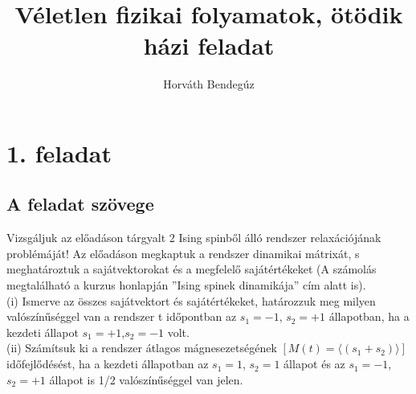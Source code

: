 \documentclass[12pt]{article}
\title{Véletlen fizikai folyamatok, ötödik házi feladat}
\author{Horváth Bendegúz}
\begin{document}
\maketitle
\section*{1. feladat}
\subsection*{A feladat szövege}
Vizsgáljuk az előadáson tárgyalt 2 Ising spinből álló rendszer relaxációjának problémáját! Az előadáson megkaptuk a rendszer dinamikai mátrixát, s meghatároztuk a sajátvektorokat és a megfelelő sajátértékeket (A számolás megtalálható a kurzus honlapján ”Ising spinek dinamikája” cím alatt is).\\
(i) Ismerve az összes sajátvektort és sajátértékeket, határozzuk meg milyen valószínűséggel van a rendszer t időpontban az $s_1 = {-1}$, $s_2 = +1$ állapotban, ha a kezdeti állapot $s_1 = +1$,$s_2 =-1$ volt.\\
(ii) Számítsuk ki a rendszer átlagos mágnesezetségének $[M(t) = \langle(s_1+s_2)\rangle] $időfejlődésést, ha a kezdeti állapotban az $s_1 = 1$, $ s_2 = 1$ állapot és az $s_1 = -1$, $s_2 = +1$ állapot is 1/2 valószínűséggel van jelen.
\end{document}
